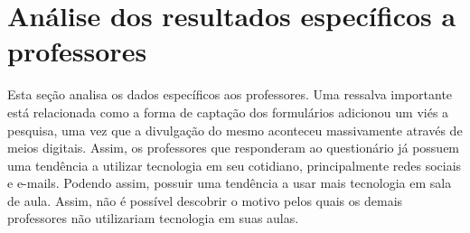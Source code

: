 


\section{Análise dos resultados específicos a professores}

Esta seção analisa os dados específicos aos professores. Uma ressalva importante está relacionada como a forma de captação dos formulários adicionou um viés a pesquisa, uma vez que a divulgação do mesmo aconteceu massivamente através de meios digitais.  Assim, os professores que responderam ao questionário já possuem uma tendência a utilizar tecnologia em seu cotidiano, principalmente redes sociais e e-mails. Podendo assim, possuir uma tendência a usar mais tecnologia em sala de aula. Assim, não é possível descobrir o motivo pelos quais os demais professores não utilizariam tecnologia em suas aulas.

